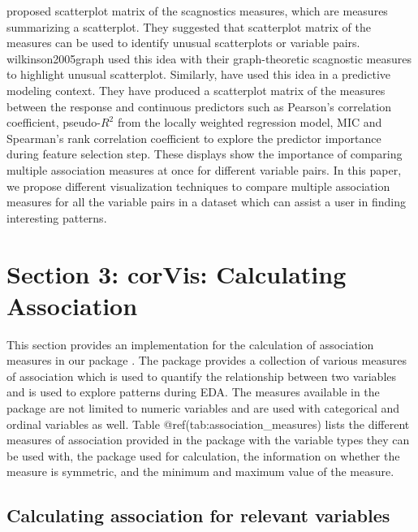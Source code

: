 \citet{tukey1985computer} proposed scatterplot matrix of the scagnostics
measures, which are measures summarizing a scatterplot. They suggested
that scatterplot matrix of the measures can be used to identify unusual
scatterplots or variable pairs. wilkinson2005graph used this idea with
their graph-theoretic scagnostic measures to highlight unusual
scatterplot. Similarly, \citet{kuhn2013applied} have used this idea in a
predictive modeling context. They have produced a scatterplot matrix of
the measures between the response and continuous predictors such as
Pearson's correlation coefficient, pseudo-\(R^2\) from the locally
weighted regression model, MIC and Spearman's rank correlation
coefficient to explore the predictor importance during feature selection
step. These displays show the importance of comparing multiple
association measures at once for different variable pairs. In this
paper, we propose different visualization techniques to compare multiple
association measures for all the variable pairs in a dataset which can
assist a user in finding interesting patterns.

\hypertarget{section-3-corvis-calculating-association}{%
\section{Section 3: corVis: Calculating
Association}\label{section-3-corvis-calculating-association}}

This section provides an implementation for the calculation of
association measures in our package . The package
provides a collection of various measures of association which is used
to quantify the relationship between two variables and is used to
explore patterns during EDA. The measures available in the package are
not limited to numeric variables and are used with categorical and
ordinal variables as well. Table @ref(tab:association\_measures) lists
the different measures of association provided in the package with the
variable types they can be used with, the package used for calculation,
the information on whether the measure is symmetric, and the minimum and
maximum value of the measure.

\hypertarget{calculating-association-for-relevant-variables}{%
\subsection{Calculating association for relevant
variables}\label{calculating-association-for-relevant-variables}}

